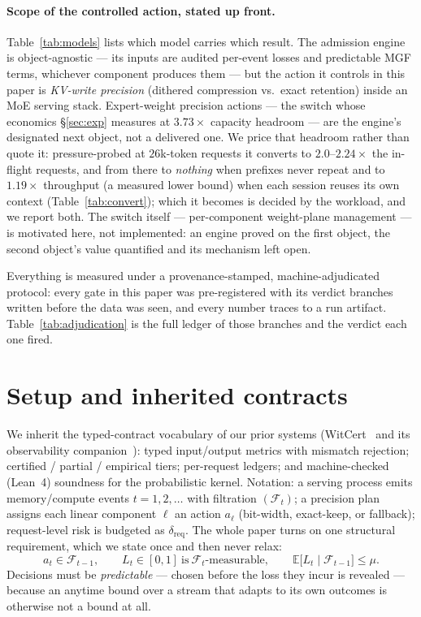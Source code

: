 \documentclass[11pt]{article}
\renewcommand{\_}{\WCorigunderscore\allowbreak}
\begin{document}
\paragraph{Scope of the controlled action, stated up front.}
Table~\ref{tab:models} lists which model carries which result. The
admission engine is object-agnostic --- its inputs are audited
per-event losses and predictable MGF terms, whichever component
produces them --- but the action it controls in this paper is
\emph{KV-write precision} (dithered compression vs.\ exact retention)
inside an MoE serving stack. Expert-weight precision actions --- the switch whose economics
\S\ref{sec:exp} measures at $3.73\times$ capacity headroom --- are the
engine's designated next object, not a delivered one. We price that
headroom rather than quote it: pressure-probed at $26$k-token requests
it converts to $2.0$--$2.24\times$ the in-flight requests, and from
there to \emph{nothing} when prefixes never repeat and to
$1.19\times$ throughput (a measured lower bound) when each session
reuses its own context (Table~\ref{tab:convert}); which it becomes is
decided by the workload, and we report both. The switch itself --- per-component
weight-plane management --- is motivated here, not implemented: an
engine proved on the first object, the second object's value
quantified and its mechanism left open.

Everything is measured under a provenance-stamped, machine-adjudicated
protocol: every gate in this paper was pre-registered with its verdict
branches written before the data was seen, and every number traces to a
run artifact. Table~\ref{tab:adjudication} is the full ledger of those
branches and the verdict each one fired.



\section{Setup and inherited contracts}
We inherit the typed-contract vocabulary of our prior systems
(WitCert~\cite{witcert2026} and its observability
companion~\cite{witprobe2026}): typed
input/output metrics with mismatch
rejection; certified / partial / empirical tiers; per-request ledgers;
and machine-checked (Lean~4) soundness for the probabilistic kernel.
Notation: a serving process emits memory/compute events $t=1,2,\dots$
with filtration $(\mathcal F_t)$; a precision plan assigns each linear
component $\ell$ an action $a_\ell$ (bit-width, exact-keep, or
fallback); request-level risk is budgeted as $\delta_{\mathrm{req}}$.
The whole paper turns on one structural requirement, which we state once
and then never relax:
\begin{equation}\label{eq:predictable}
  a_t\in\mathcal F_{t-1},
  \qquad
  L_t\in[0,1]\ \text{is}\ \mathcal F_t\text{-measurable},
  \qquad
  \mathbb{E}\big[L_t\mid\mathcal F_{t-1}\big]\le\mu .
\end{equation}
Decisions must be \emph{predictable} --- chosen before the loss they
incur is revealed --- because an anytime bound over a stream that adapts
to its own outcomes is otherwise not a bound at all.
\end{document}
